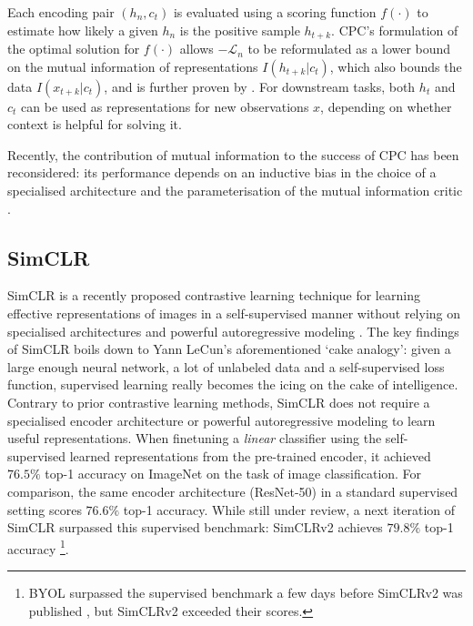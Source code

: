 Each encoding pair $(h_n, c_t)$ is evaluated using a scoring function $f(\cdot)$ to estimate how likely a given $h_n$ is the positive sample $h_{t+k}$.
CPC's formulation of the optimal solution for $f(\cdot)$ allows $-\mathcal{L}_n$ to be reformulated as a lower bound on the mutual information of representations $I(h_{t+k} | c_t)$, which also bounds the data $I(x_{t+k} | c_t)$, and is further proven by \cite{poole_variational_2019}.
For downstream tasks, both $h_t$ and $c_t$ can be used as representations for new observations $x$, depending on whether context is helpful for solving it.

Recently, the contribution of mutual information to the success of CPC has been reconsidered: its performance depends on an inductive bias in the choice of a specialised architecture and the parameterisation of the mutual information critic \cite{Tschannen2020OnMI}.



\subsection{SimCLR}
SimCLR is a recently proposed contrastive learning technique for learning effective representations of images in a self-supervised manner without relying on specialised architectures and powerful autoregressive modeling \cite{chen_simple_2020}.
The key findings of SimCLR boils down to Yann LeCun's aforementioned `cake analogy': given a large enough neural network, a lot of unlabeled data and a self-supervised loss function, supervised learning really becomes the icing on the cake of intelligence.
Contrary to prior contrastive learning methods, SimCLR does not require a specialised encoder architecture or powerful autoregressive modeling to learn useful representations.
When finetuning a \textit{linear} classifier using the self-supervised learned representations from the pre-trained encoder, it achieved $76.5\%$ top-1 accuracy on ImageNet on the task of image classification.
For comparison, the same encoder architecture (ResNet-50) in a standard supervised setting scores $76.6\%$ top-1 accuracy.
While still under review, a next iteration of SimCLR surpassed this supervised benchmark: SimCLRv2 achieves $79.8\%$ top-1 accuracy \cite{chen2020big}\footnote{BYOL surpassed the supervised benchmark a few days before SimCLRv2 was published \cite{Grill2020BootstrapYO}, but SimCLRv2 exceeded their scores.}.

